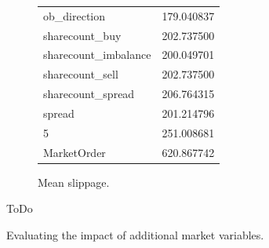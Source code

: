 \begin{figure}[ht]
\begin{subfigure}[b]{0.25\textwidth}
{\begin{tabular}{lr}
ob\_direction           &  179.040837 \\
sharecount\_buy         &  202.737500 \\
sharecount\_imbalance   &  200.049701 \\
sharecount\_sell        &  202.737500 \\
sharecount\_spread      &  206.764315 \\
spread                 &  201.214796 \\
5                      &  251.008681 \\
MarketOrder            &  620.867742 \\
\bottomrule
\end{tabular}}        		 
        		\caption{Mean slippage.}
		\label{fig:eval:additionalMarketVariables:mean}
    	\end{subfigure}

	\caption{Evaluating the impact of additional market variables.}
	ToDo
	\label{fig:eval:additionalMarketVariables}
\end{figure}







\cleardoublepage{}
